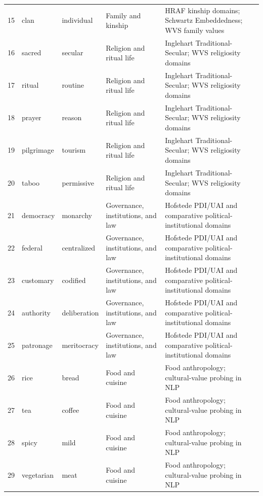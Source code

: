 \begin{tabular}{@{}rlllll@{}}
15 & clan & individual & Family and kinship & HRAF kinship domains; Schwartz Embeddedness; WVS family values & \cite{schwartz2006theory} \\
16 & sacred & secular & Religion and ritual life & Inglehart Traditional-Secular; WVS religiosity domains & \cite{inglehart2005modernization} \\
17 & ritual & routine & Religion and ritual life & Inglehart Traditional-Secular; WVS religiosity domains & \cite{house2004culture} \\
18 & prayer & reason & Religion and ritual life & Inglehart Traditional-Secular; WVS religiosity domains & \cite{inglehart2005modernization} \\
19 & pilgrimage & tourism & Religion and ritual life & Inglehart Traditional-Secular; WVS religiosity domains & \cite{hershcovich2022challenges} \\
20 & taboo & permissive & Religion and ritual life & Inglehart Traditional-Secular; WVS religiosity domains & \cite{hofstede2001culture} \\
21 & democracy & monarchy & Governance, institutions, and law & Hofstede PDI/UAI and comparative political-institutional domains & \cite{hofstede2001culture} \\
22 & federal & centralized & Governance, institutions, and law & Hofstede PDI/UAI and comparative political-institutional domains & \cite{house2004culture} \\
23 & customary & codified & Governance, institutions, and law & Hofstede PDI/UAI and comparative political-institutional domains & \cite{hofstede2001culture} \\
24 & authority & deliberation & Governance, institutions, and law & Hofstede PDI/UAI and comparative political-institutional domains & \cite{house2004culture} \\
25 & patronage & meritocracy & Governance, institutions, and law & Hofstede PDI/UAI and comparative political-institutional domains & \cite{hofstede2001culture} \\
26 & rice & bread & Food and cuisine & Food anthropology; cultural-value probing in NLP & \cite{hershcovich2022challenges} \\
27 & tea & coffee & Food and cuisine & Food anthropology; cultural-value probing in NLP & \cite{hershcovich2022challenges} \\
28 & spicy & mild & Food and cuisine & Food anthropology; cultural-value probing in NLP & \cite{hershcovich2022challenges} \\
29 & vegetarian & meat & Food and cuisine & Food anthropology; cultural-value probing in NLP & \cite{arora2023probing} \\

\end{tabular}
